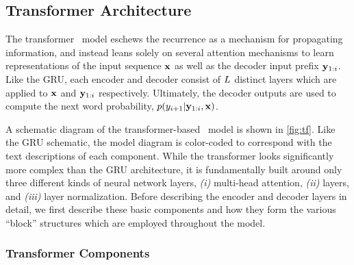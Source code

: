 \subsection{Transformer Architecture}




The transformer \sequencetosequence~model eschews the recurrence as a mechanism
for propagating information, and instead leans solely on several 
attention mechanisms to learn representations of the input sequence $\mathbf{x}$
as well as the decoder input prefix $\mathbf{y}_{1:i}$. Like the GRU,
each encoder and decoder consist of $L$ distinct
layers which are applied to $\mathbf{x}$ and $\mathbf{y}_{1:i}$ respectively.
Ultimately,
the decoder outputs are used to compute the next word probability,
$p(y_{i+1}|\mathbf{y}_{1:i},\mathbf{x})$. 

A schematic diagram of the transformer-based \sequencetosequence~model
is shown in \autoref{fig:tf}. Like the GRU schematic, the model diagram is 
color-coded to correspond with the text descriptions of each component.
While the transformer looks significantly more complex than the 
GRU architecture, it is fundamentally built around only three 
different kinds of 
neural network layers, \textit{(i)} multi-head attention, 
\textit{(ii)} \feedforward layers, and \textit{(iii)} 
layer normalization. Before describing the encoder and decoder layers
in detail, we first describe these basic components and how they form 
the various ``block'' structures which are employed throughout the model.

\subsubsection{Transformer Components}

